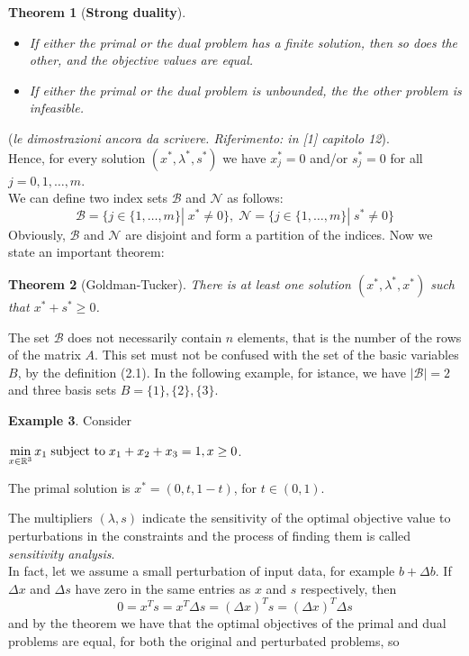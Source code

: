 \documentclass[a4paper,10 pt,titlepage,twoside]{book}
\theoremstyle{plain}
\newtheorem{thm}{Theorem}[chapter]
\theoremstyle{definition}
\newtheorem{ex}[thm]{Example}
\theoremstyle{remark}
\begin{document}
\begin{thm}[\textbf{Strong duality}] \
\begin{itemize}
\item If either the primal or the dual problem has a finite solution, then so does the other, and the objective values are equal.
\item If either the primal or the dual problem is unbounded, the the other problem is infeasible.
\end{itemize}
\end{thm}
(\textit{le dimostrazioni ancora da scrivere. Riferimento: in [1] capitolo 12}).\\
Hence, for every solution $(x^{*}, \lambda^{*}, s^{*})$ we have $x_{j}^{*}= 0$ and/or $s_{j}^{*}= 0$ for all $j=0,1,\dots,m$.\\
We can define two index sets $\mathcal{B}$ and $\mathcal{N}$ as follows:
\begin{equation}
\mathcal{B} =\{j\in\{1,\dots,m\}|\; x^{*} \not= 0\}, \;
\mathcal{N} =\{j\in\{1,\dots,m\}|\; s^{*} \not= 0\}
\end{equation}  
Obviously, $\mathcal{B}$ and $\mathcal{N}$ are disjoint and form a partition of the indices. Now we state an important theorem:
\begin{thm}[Goldman-Tucker]
	There is at least one solution $(x^{*}, \lambda^{*}, x^{*})$ such that $x^{*}+s^{*}\geq0$.
\end{thm}
The set $\mathcal{B}$ does not necessarily contain $n$ elements, that is the number of the rows of the matrix $A$. This set must not be confused with the set of the basic variables $B$, by the definition (2.1). In the following example, for istance, we have $|\mathcal{B}|= 2$ and three basis sets $B = \{1\}, \{2\}, \{3\}$.
\begin{ex}
Consider
\begin{center} $\min\limits_{x\in\mathbb{R}^{3}} x_{1} \text{\;subject to\;} x_{1}+x_{2}+x_{3} = 1, x\geq 0$.\end{center}
The primal solution is $x^{*}=(0, t, 1-t)$, for $t\in(0,1)$. 	
\end{ex} 

The multipliers $(\lambda,s)$ indicate the sensitivity of the optimal objective value  to perturbations in the constraints and the process of finding them is called \textit{sensitivity analysis}. \\ In fact, let we assume a small perturbation of input data, for example $b + \Delta b$. If $\Delta x$ and $\Delta s$ have zero in the same entries as $x$ and $s$ respectively, then
\begin{equation*}
0=x^{T}s=x^{T}\Delta s= \left( \Delta x\right)^{T}s=\left( \Delta x\right)^{T}\Delta s
\end{equation*}
and by the theorem we have that the optimal objectives of the primal and dual problems are equal, for both the original and perturbated problems, so
\end{document}
